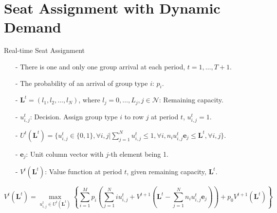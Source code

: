
\section{Seat Assignment with Dynamic Demand}
    \frame{\sectionpage}

    \begin{frame}{Real-time Seat Assignment}
      \centering
      \small
      \begin{itemize}
      \item[-] There is one and only one group arrival at each period, $t = 1, \ldots, T+1$. 
      \item[-] The probability of an arrival of group type $i$: $p_i$.
      \item[-] $\mathbf{L}^{t} = (l_1, l_2, \ldots, l_{N})$, where $l_j =0,\ldots, L_j, j\in \mathcal{N}$: Remaining capacity.
      \item[-] $u_{i,j}^{t}$: Decision. Assign group type $i$ to row $j$ at period $t$, $u_{i,j}^t =1$.
      \item[-] $U^{t}(\mathbf{L}^{t}) = \{u_{i,j}^{t} \in\{0,1\}, \forall i,j| \sum_{j=1}^{N} u_{i,j}^{t} \leq 1, \forall i, n_{i}u_{i,j}^{t}\mathbf{e}_j \leq \mathbf{L}^{t}, \forall i,j \}$.
      \item[-] $\mathbf{e}_j$: Unit column vector with $j$-th element being 1.
      \item[-] $V^{t}(\mathbf{L}^{t})$: Value function at period $t$, given remaining capacity, $\mathbf{L}^{t}$.
      \end{itemize}
  
      $$V^{t}(\mathbf{L}^{t}) = \max_{u_{i,j}^{t} \in U^{t}(\mathbf{L}^{t})}\left\{ \sum_{i=1}^{M} p_i ( \sum_{j=1}^{N} i u_{i,j}^{t} + V^{t+1}(\mathbf{L}^{t}- \sum_{j=1}^{N} n_i u_{i,j}^{t}\mathbf{e}_j)) + p_0 V^{t+1}(\mathbf{L}^{t})\right\}$$
      \small
  \end{frame}

